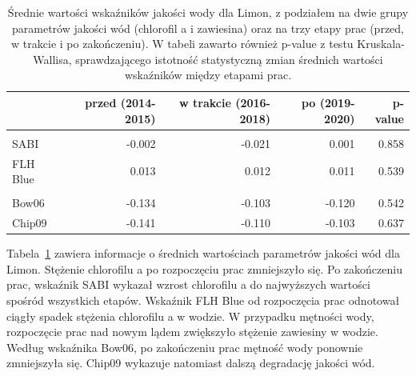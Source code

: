 \documentclass{amuthesis}
\begin{document}
\hypertarget{tbl-cr_stats}{}
\begin{table}
\caption{\label{tbl-cr_stats}Średnie wartości wskaźników jakości wody dla Limon, z podziałem na dwie
grupy parametrów jakości wód (chlorofil a i zawiesina) oraz na trzy
etapy prac (przed, w trakcie i po zakończeniu). W tabeli zawarto również
p-value z testu Kruskala-Wallisa, sprawdzającego istotność statystyczną
zmian średnich wartości wskaźników między etapami prac. }\tabularnewline

\centering
\begin{tabular}{lrrrr}
\toprule
  & przed (2014-2015) & w trakcie (2016-2018) & po (2019-2020) & p-value\\
\midrule
\addlinespace[0.3em]
\multicolumn{5}{l}{\textbf{chlorofil a}}\\
\hspace{1em}SABI & -0.002 & -0.021 & 0.001 & 0.858\\
\hspace{1em}FLH Blue & 0.013 & 0.012 & 0.011 & 0.539\\
\addlinespace[0.3em]
\multicolumn{5}{l}{\textbf{zawiesina}}\\
\hspace{1em}Bow06 & -0.134 & -0.103 & -0.120 & 0.542\\
\hspace{1em}Chip09 & -0.141 & -0.110 & -0.103 & 0.637\\
\bottomrule
\end{tabular}
\end{table}

Tabela~\ref{tbl-cr_stats} zawiera informacje o średnich wartościach
parametrów jakości wód dla Limon. Stężenie chlorofilu a po rozpoczęciu
prac zmniejszyło się. Po zakończeniu prac, wskaźnik SABI wykazał wzrost
chlorofilu a do najwyższych wartości spośród wszystkich etapów. Wskaźnik
FLH Blue od rozpoczęcia prac odnotował ciągły spadek stężenia chlorofilu
a w wodzie. W przypadku mętności wody, rozpoczęcie prac nad nowym lądem
zwiększyło stężenie zawiesiny w wodzie. Według wskaźnika Bow06, po
zakończeniu prac mętność wody ponownie zmniejszyła się. Chip09 wykazuje
natomiast dalszą degradację jakości wód.
\end{document}
